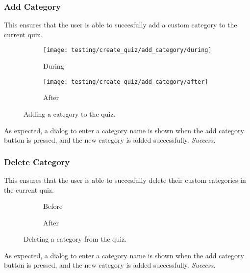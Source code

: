 \subsubsection{Add Category} %
\label{ssub:add_category}
This ensures that the user is able to succesfully add a custom category to the current quiz.
\begin{figure}[!htbp]
\centering
\begin{subfigure}{0.5\textwidth}
  \centering
  \texttt{[image: testing/create\_quiz/add\_category/during]}
  \caption{During}
  \label{fig:sub1}
\end{subfigure}%
\begin{subfigure}{0.5\textwidth}
  \centering
  \texttt{[image: testing/create\_quiz/add\_category/after]}
  \caption{After}
  \label{fig:sub2}
\end{subfigure}
\caption{Adding a category to the quiz.}
\label{fig:test}
\end{figure}
As expected, a dialog to enter a category name is shown when the add category button is pressed, and the new category is added successfully. \textit{Success.}


\subsubsection{Delete Category} %
\label{ssub:add_category}
This ensures that the user is able to succesfully delete their custom categories in the current quiz.
\begin{figure}[!htbp]
\centering
\begin{subfigure}{0.5\textwidth}
  \centering
  \caption{Before}
  \label{fig:sub1}
\end{subfigure}%
\begin{subfigure}{0.5\textwidth}
  \centering
  \caption{After}
  \label{fig:sub2}
\end{subfigure}
\caption{Deleting a category from the quiz.}
\label{fig:test}
\end{figure}
As expected, a dialog to enter a category name is shown when the add category button is pressed, and the new category is added successfully. \textit{Success.}


